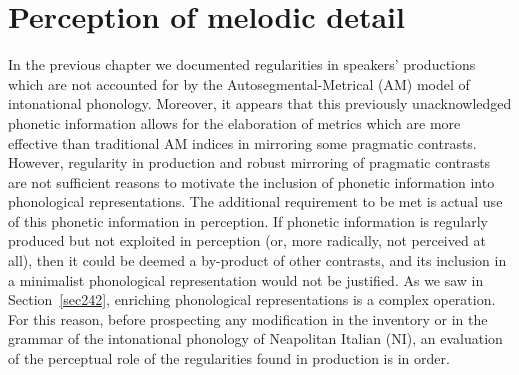 \chapter[Perception of melodic detail]{Perception of melodic detail}\label{sec3}
In the previous chapter we documented regularities in speakers' productions which are not accounted for by the Autosegmental-Metrical (AM) model of intonational phonology. Moreover, it appears that this previously unacknowledged phonetic information allows for the elaboration of metrics which are more effective than traditional AM indices in mirroring some pragmatic contrasts. However, regularity in production and robust mirroring of pragmatic contrasts are not sufficient reasons to motivate the inclusion of phonetic information into phonological representations. The additional requirement to be met is actual use of this phonetic information in perception. If phonetic information is regularly produced but not exploited in perception (or, more radically, not perceived at all), then it could be deemed a by-product of other contrasts, and its inclusion in a minimalist phonological representation would not be justified. As we saw in  Section~\ref{sec242}, enriching phonological representations is a complex operation. For this reason, before prospecting any modification in the inventory or in the grammar of the intonational phonology of Neapolitan Italian (NI), an evaluation of the perceptual role of the regularities found in production is in order.

